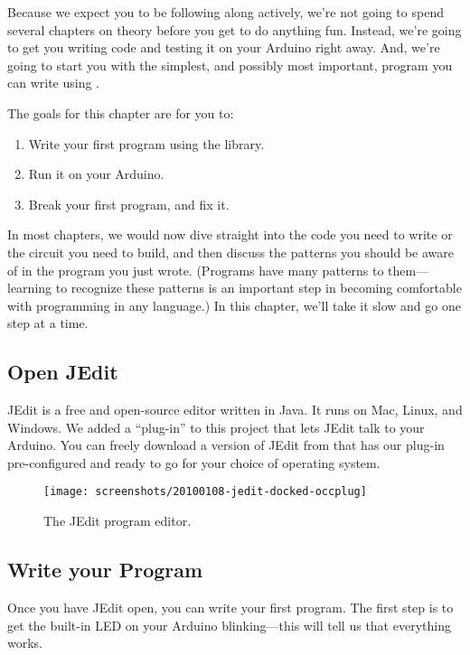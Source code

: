 Because we expect you to be following along actively, we're not going to spend several chapters on theory before you get to do anything fun. Instead, we're going to get you writing code and testing it on your Arduino right away. And, we're going to start you with the simplest, and possibly most important, program you can write using \plumbing.

\GOALS
The goals for this chapter are for you to:

\begin{enumerate}
	\item Write your first program using the \plumbing library.
	\item Run it on your Arduino.
	\item Break your first program, and fix it.
\end{enumerate}


\CODE
In most chapters, we would now dive straight into the code you need to write or the circuit you need to build, and then discuss the patterns you should be aware of in the program you just wrote. (Programs have many patterns to them---learning to recognize these patterns is an important step in becoming comfortable with programming in any language.) In this chapter, we'll take it slow and go one step at a time.
          
\subsection{Open JEdit}
JEdit is a free and open-source editor written in Java. It runs on Mac, Linux, and Windows. We added a ``plug-in'' to this project that lets JEdit talk to your Arduino. You can freely download a version of JEdit from \ccc that has our plug-in pre-configured and ready to go for your choice of operating system.
      
\begin{figure}[bph]
  \begin{center}
    \texttt{[image: screenshots/20100108-jedit-docked-occplug]}
    \caption{The JEdit program editor.}
    \label{screenshot:jedit-occplug-docked}
  \end{center}
\end{figure}

\afterpage{\clearpage}

\subsection{Write your Program}
Once you have JEdit open, you can write your first program. The first step is to get the built-in LED on your Arduino blinking---this will tell us that everything works. 

